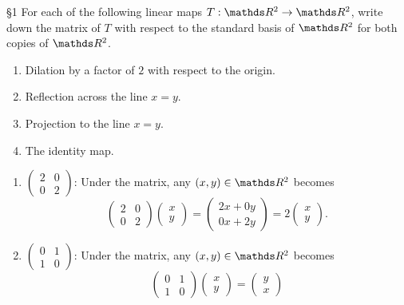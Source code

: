 \documentclass{review-sheet}
\begin{document}
\begin{problem}{\S 1}
  For each of the following linear maps $T: \R^2 \to \R^2$, write down the matrix of $T$ with
  respect to the standard basis of $\R^2$ for both copies of $\R^2$.
  \begin{enumerate}[label=(\alph*)]
    \item Dilation by a factor of $2$ with respect to the origin.
    \item Reflection across the line $x=y$.
    \item Projection to the line $x=y$.
    \item The identity map.
  \end{enumerate}
\end{problem}

\begin{solution}
  \begin{enumerate}[label=(\alph*)]
    \item  $\begin{pmatrix} 2&0\\0&2 \end{pmatrix} $:  Under the matrix, any $(x,y)\in \R^2$ becomes
      \[
        \begin{pmatrix} 2&0\\0&2 \end{pmatrix} \begin{pmatrix} x\\y \end{pmatrix} =\begin{pmatrix}
      2x+0y\\0x+2y \end{pmatrix} = 2\begin{pmatrix} x\\y \end{pmatrix} 
      .\] 
    \item $ \begin{pmatrix} 0&1\\1&0 \end{pmatrix} $: Under the matrix, any $(x,y)\in \R^2$ becomes
      \[
        \begin{pmatrix} 0&1\\1&0 \end{pmatrix} \begin{pmatrix} x\\y \end{pmatrix} =\begin{pmatrix}
      y\\x \end{pmatrix} 
\]
\end{enumerate}
\end{solution}
\end{document}
